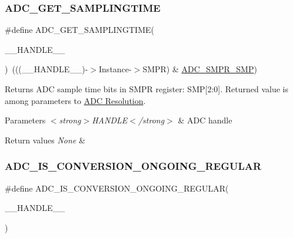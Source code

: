 \subsubsection{\texorpdfstring{A\+D\+C\+\_\+\+G\+E\+T\+\_\+\+S\+A\+M\+P\+L\+I\+N\+G\+T\+I\+ME}{ADC\_GET\_SAMPLINGTIME}}
{\footnotesize\ttfamily \#define A\+D\+C\+\_\+\+G\+E\+T\+\_\+\+S\+A\+M\+P\+L\+I\+N\+G\+T\+I\+ME(\begin{DoxyParamCaption}\item[{}]{\+\_\+\+\_\+\+H\+A\+N\+D\+L\+E\+\_\+\+\_\+ }\end{DoxyParamCaption})~(((\+\_\+\+\_\+\+H\+A\+N\+D\+L\+E\+\_\+\+\_\+)-\/$>$Instance-\/$>$S\+M\+PR) \& \hyperlink{group___peripheral___registers___bits___definition_gaceac2124a2a41388f9f5e5c2c310a27e}{A\+D\+C\+\_\+\+S\+M\+P\+R\+\_\+\+S\+MP})}



Returns A\+DC sample time bits in S\+M\+PR register\+: S\+MP\mbox{[}2\+:0\mbox{]}. Returned value is among parameters to \hyperlink{group___a_d_c___resolution}{A\+DC Resolution}. 


\begin{DoxyParams}{Parameters}
{\em $<$strong$>$\+H\+A\+N\+D\+L\+E$<$/strong$>$} & A\+DC handle \\
\hline
\end{DoxyParams}

\begin{DoxyRetVals}{Return values}
{\em None} & \\
\hline
\end{DoxyRetVals}
\mbox{\label{group___a_d_c___private___macros_ga5df8ea820271c854b85617162b08c6d3}} 
\subsubsection{\texorpdfstring{A\+D\+C\+\_\+\+I\+S\+\_\+\+C\+O\+N\+V\+E\+R\+S\+I\+O\+N\+\_\+\+O\+N\+G\+O\+I\+N\+G\+\_\+\+R\+E\+G\+U\+L\+AR}{ADC\_IS\_CONVERSION\_ONGOING\_REGULAR}}
{\footnotesize\ttfamily \#define A\+D\+C\+\_\+\+I\+S\+\_\+\+C\+O\+N\+V\+E\+R\+S\+I\+O\+N\+\_\+\+O\+N\+G\+O\+I\+N\+G\+\_\+\+R\+E\+G\+U\+L\+AR(\begin{DoxyParamCaption}\item[{}]{\+\_\+\+\_\+\+H\+A\+N\+D\+L\+E\+\_\+\+\_\+ }\end{DoxyParamCaption})}

